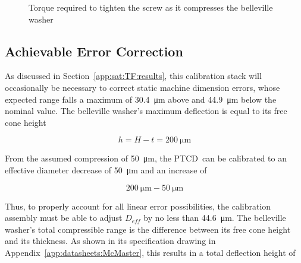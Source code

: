 \documentclass[12pt, letterpaper]{report}%
\newcounter{mycounter}           %
\newcounter{sub}[mycounter]      %
\newcommand{\device}{PTCD}
\begin{document}
\begin{appendices}
			\vspace{1em}
			\begin{figure}[H]
				\centering
				\caption{Torque required to tighten the screw as it compresses the belleville washer}
				\label{fig:belle_torque}
			\end{figure}

		\subsection{Achievable Error Correction}
		\label{app:calcs:cal:sat}

			As discussed in Section~\ref{app:sat:TF:results}, this calibration stack will occasionally be necessary to correct static machine dimension errors,
			whose expected range falls a maximum of \SI{30.4}{\micro\meter} above and \SI{44.9}{\micro\meter} below the nominal value.
			The belleville washer's maximum deflection is equal to its free cone height

			\begin{equation}
				h = H - t = \SI{200}{\micro\meter}
			\end{equation}

			From the assumed compression of \SI{50}{\micro\meter}, the \device\ can be calibrated to an effective diameter decrease of \SI{50}{\micro\meter} and an increase of

			\begin{equation}
				\SI{200}{\micro\meter} - \SI{50}{\micro\meter}
			\end{equation}

			Thus, to properly account for all linear error possibilities, the calibration assembly must be able to adjust $D_{eff}$ by no less than \SI{44.6}{\micro\meter}.
			The belleville washer's total compressible range is the difference between its free cone height and its thickness.
			As shown in its specification drawing in Appendix~\ref{app:datasheets:McMaster}, this results in a total deflection height of


\end{appendices}
\end{document}
